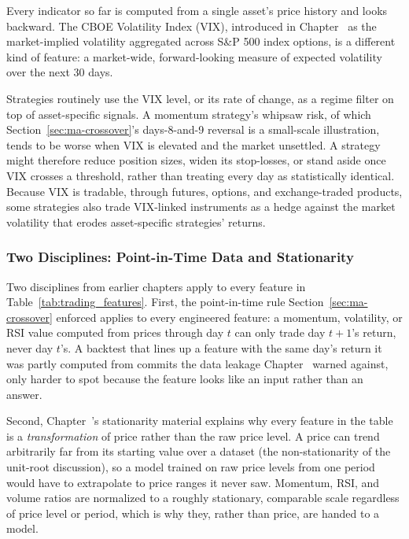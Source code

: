 \documentclass[../ai_in_finance]{subfiles}
\begin{document}
Every indicator so far is computed from a single asset's price history and looks backward. The CBOE Volatility Index (VIX), introduced in Chapter~ as the market-implied volatility aggregated across S\&P 500 index options, is a different kind of feature: a market-wide, forward-looking measure of expected volatility over the next 30 days.

Strategies routinely use the VIX level, or its rate of change, as a regime filter on top of asset-specific signals. A momentum strategy's whipsaw risk, of which Section~\ref{sec:ma-crossover}'s days-8-and-9 reversal is a small-scale illustration, tends to be worse when VIX is elevated and the market unsettled. A strategy might therefore reduce position sizes, widen its stop-losses, or stand aside once VIX crosses a threshold, rather than treating every day as statistically identical. Because VIX is tradable, through futures, options, and exchange-traded products, some strategies also trade VIX-linked instruments as a hedge against the market volatility that erodes asset-specific strategies' returns.

\subsubsection*{Two Disciplines: Point-in-Time Data and Stationarity}

Two disciplines from earlier chapters apply to every feature in Table~\ref{tab:trading_features}. First, the point-in-time rule Section~\ref{sec:ma-crossover} enforced applies to every engineered feature: a momentum, volatility, or RSI value computed from prices through day $t$ can only trade day $t+1$'s return, never day $t$'s. A backtest that lines up a feature with the same day's return it was partly computed from commits the data leakage Chapter~ warned against, only harder to spot because the feature looks like an input rather than an answer.

Second, Chapter~'s stationarity material explains why every feature in the table is a \emph{transformation} of price rather than the raw price level. A price can trend arbitrarily far from its starting value over a dataset (the non-stationarity of the unit-root discussion), so a model trained on raw price levels from one period would have to extrapolate to price ranges it never saw. Momentum, RSI, and volume ratios are normalized to a roughly stationary, comparable scale regardless of price level or period, which is why they, rather than price, are handed to a model.
\end{document}
